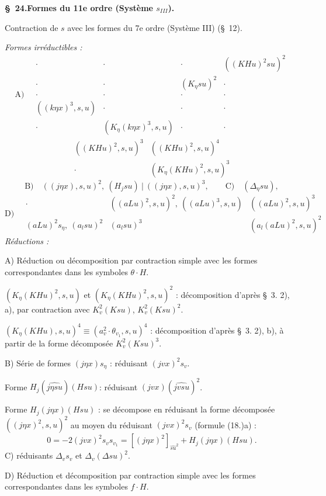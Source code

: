 \documentclass[11pt]{article}
\newcommand{\D}{\Delta}
\begin{document}
\begin{center}\textbf{\S\ 24.\quad Formes du 11e ordre (Système $s_{III}$).}\end{center}
Contraction de $s$ avec les formes du 7e ordre (Système III) (\S\ 12).

\noindent\emph{Formes irréductibles :}
\[
\text{A)}\quad
\begin{array}{c|c|c|c}
\cdot&\cdot&\cdot&((KHu)^2su)^2\\[0.35em]
\cdot&\cdot&(K_\eta su)^2&\cdot\\[0.35em]
\cdot&\cdot&\cdot&\cdot\\[0.35em]
((k\eta x)^3,s,u)&\cdot&\cdot&\cdot\\[0.35em]
\cdot&(K_\eta(k\eta x)^3,s,u)&\cdot&\cdot
\end{array}
\]
\[
\begin{array}{c|c}
((KHu)^2,s,u)^3&((KHu)^2,s,u)^4\\[0.45em]
\cdot&(K_\eta(KHu)^2,s,u)^3
\end{array}
\]
\[
\text{B)}\quad ((j\eta x),s,u)^2,\ (H_jsu)\ \big|\ ((j\eta x),s,u)^3,
\qquad \text{C)}\quad (\D_\eta su),
\]
\[
\text{D)}\quad
\begin{array}{c|c|c}
\cdot&((aLu)^2,s,u)^2,\ ((aLu)^3,s,u)&((aLu)^2,s,u)^3\\[0.5em]
(aLu)^2s_\eta,\ (a_lsu)^2&(a_lsu)^3&(a_l(aLu)^2,s,u)^2
\end{array}
\]
\noindent\emph{Réductions :}

A) Réduction ou décomposition par contraction simple avec les formes correspondantes dans les symboles $\theta\cdot H$.

$(K_\eta(KHu)^2,s,u)$ et $(K_\eta(KHu)^2,s,u)^2$ : décomposition d'après \S\ 3. 2), a), par contraction avec $K_v^2(Ksu)$, $K_v^2(Ksu)^2$.

$(K_\eta(KHu),s,u)^4\equiv(a_v^2\cdot\theta_{v_1},s,u)^4$ : décomposition d'après \S\ 3. 2), b), à partir de la forme décomposée $K_v^2(Ksu)^3$.

B) Série de formes $(j\eta x)s_\eta$ : réduisant $(jv x)^2s_v$.

Forme $H_j(\widehat{j\eta su})(Hsu)$: réduisant $(jv x)(\widehat{jv su})^2$.

Forme $H_j(j\eta x)(Hsu)$ : se décompose en réduisant la forme décomposée $((j\eta x)^2,s,u)^2$ au moyen du réduisant $(jv x)^2s_v$ (formule (18.)a) :
\[
0=-2(jv x)^2s_v s_{v_1}=[(j\eta x)^2]_{\widehat{su}^2}+H_j(j\eta x)(Hsu).
\]
C) réduisants $\D_v s_v$ et $\D_v(\D su)^2$.

D) Réduction et décomposition par contraction simple avec les formes correspondantes dans les symboles $f\cdot H$.
\end{document}
